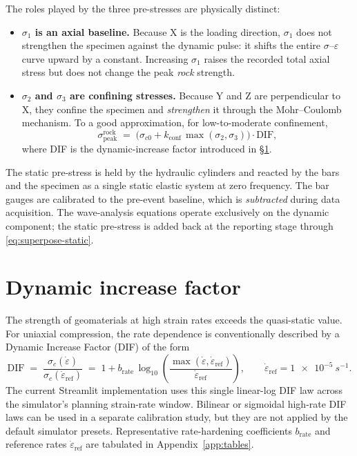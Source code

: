 \documentclass[11pt,a4paper,openany]{book}
\providecommand{\SI}[2]{\qty{#1}{#2}}
\theoremstyle{handbook}
\newcommand{\sig}{\sigma}
\newcommand{\eps}{\varepsilon}
\newcommand{\epsdot}{\dot\eps}
\begin{document}
The roles played by the three pre-stresses are physically distinct:
\begin{itemize}[leftmargin=*,itemsep=4pt]
  \item \textbf{$\sig_1$ is an axial baseline.} Because X is the loading
        direction, $\sig_1$ does not strengthen the specimen against the
        dynamic pulse: it shifts the entire $\sig$--$\eps$ curve upward by
        a constant. Increasing $\sig_1$ raises the recorded total axial
        stress but does not change the peak \emph{rock} strength.
  \item \textbf{$\sig_2$ and $\sig_3$ are confining stresses.} Because Y
        and Z are perpendicular to X, they confine the specimen and
        \emph{strengthen} it through the Mohr--Coulomb mechanism. To a
        good approximation, for low-to-moderate confinement,
        \begin{equation}
          \sig_{\text{peak}}^{\text{rock}}
          \;=\; \bigl(\sig_{c0} + k_{\text{conf}}\,\max(\sig_2,\sig_3)\bigr)\cdot\text{DIF},
          \label{eq:peak-strength}
        \end{equation}
        where DIF is the dynamic-increase factor introduced in
        \S\ref{sec:DIF}.
\end{itemize}

\begin{conceptbox}
The static pre-stress is held by the hydraulic cylinders and reacted by the
bars and the specimen as a single static elastic system at zero frequency.
The bar gauges are calibrated to the pre-event baseline, which is
\emph{subtracted} during data acquisition. The wave-analysis equations
operate exclusively on the dynamic component; the static pre-stress is
added back at the reporting stage through \eqref{eq:superpose-static}.
\end{conceptbox}

\section{Dynamic increase factor}\label{sec:DIF}

The strength of geomaterials at high strain rates exceeds the quasi-static
value. For uniaxial compression, the rate dependence is conventionally
described by a Dynamic Increase Factor (DIF) of the form
\cite{CEBFIP1990,GrotePuzrinRavichandran2001}
\begin{equation}
  \text{DIF} \;=\; \frac{\sig_c(\epsdot)}{\sig_c(\epsdot_{\text{ref}})}
  \;=\; 1 + b_{\text{rate}}\,\log_{10}
  \!\left(\frac{\max(\epsdot,\epsdot_{\text{ref}})}
  {\epsdot_{\text{ref}}}\right),
  \qquad \epsdot_{\text{ref}}=\SI{1e-5}{s^{-1}}.
  \label{eq:DIF}
\end{equation}
The current Streamlit implementation uses this single linear-log DIF law
across the simulator's planning strain-rate window. Bilinear or sigmoidal
high-rate DIF laws can be used in a separate calibration study, but they
are not applied by the default simulator presets. Representative
rate-hardening coefficients $b_{\text{rate}}$ and reference rates
$\epsdot_{\text{ref}}$ are tabulated in Appendix~\ref{app:tables}.
\end{document}
